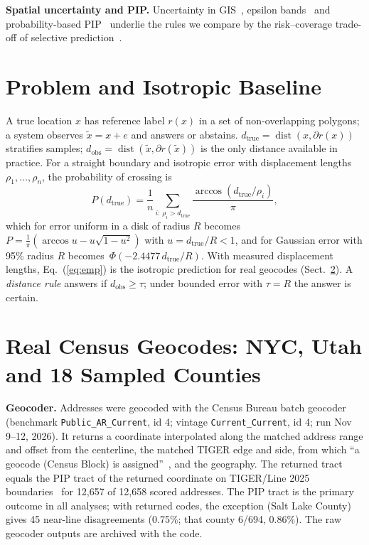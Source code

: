 \documentclass[runningheads]{llncs}
\begin{document}
\textbf{Spatial uncertainty and PIP.} Uncertainty in GIS~\cite{heuvelink1998}, epsilon bands~\cite{perkal1958,blakemore1984} and probability-based PIP~\cite{cheung2004} underlie the rules we compare by the risk--coverage trade-off of selective prediction~\cite{chow1970,geifman2017}.

\section{Problem and Isotropic Baseline}\label{sec:model}
A true location $x$ has reference label $r(x)$ in a set of non-overlapping polygons; a system observes $\tilde x = x + e$ and answers or abstains. $d_{\mathrm{true}}=\operatorname{dist}(x,\partial r(x))$ stratifies samples; $d_{\mathrm{obs}}=\operatorname{dist}(\tilde x,\partial r(\tilde x))$ is the only distance available in practice. For a straight boundary and isotropic error with displacement lengths $\rho_1,\dots,\rho_n$, the probability of crossing is
\begin{equation}
P(d_{\mathrm{true}})=\frac{1}{n}\sum_{i:\,\rho_i>d_{\mathrm{true}}}\frac{\arccos(d_{\mathrm{true}}/\rho_i)}{\pi}, \label{eq:emp}
\end{equation}
which for error uniform in a disk of radius $R$ becomes \mbox{$P=\frac{1}{\pi}(\arccos u - u\sqrt{1-u^2})$} with $u=d_{\mathrm{true}}/R<1$, and for Gaussian error with 95\% radius $R$ becomes~$\Phi(-2.4477\,d_{\mathrm{true}}/R)$. With measured displacement lengths, Eq.~(\ref{eq:emp}) is the isotropic prediction for real geocodes (Sect.~\ref{sec:real}). A \emph{distance rule} answers if $d_{\mathrm{obs}}\ge\tau$; under bounded error with $\tau=R$ the answer is certain.

\section{Real Census Geocodes: NYC, Utah and 18 Sampled Counties}\label{sec:real}
{\sloppy\textbf{Geocoder.} Addresses were geocoded with the Census Bureau batch geocoder~\cite{censusgeocoder} (benchmark \texttt{Public\_AR\_Current}, id 4; vintage \texttt{Current\_Current}, id 4; run Nov 9--12, 2026). It returns a coordinate interpolated along the matched address range and offset from the centerline, the matched TIGER edge and side, from which ``a geocode (Census Block) is assigned''~\cite{censusguide}, and the geography. The returned tract equals the PIP tract of the returned coordinate on TIGER/Line 2025 boundaries~\cite{tiger2025} for 12{,}657 of 12{,}658 scored addresses. The PIP tract is the primary outcome in all analyses; with returned codes, the exception (Salt Lake County) gives 45 near-line disagreements (0.75\%; that county 6/694, 0.86\%). The raw geocoder outputs are archived with the code.\par}
\end{document}
